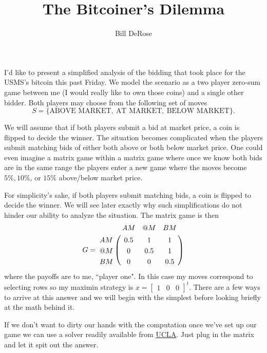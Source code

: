\documentclass[11pt, oneside]{article}
\title{The Bitcoiner's Dilemma}
\author{Bill DeRose}
\begin{document}

\maketitle
I'd like to present a simplified analysis of the bidding that took place for the 
USMS's bitcoin this past Friday. We model the scenario as a two player
zero-sum game between me (I would really like to own those coins) 
and a single other bidder. Both players may choose from the following set of 
moves $$S =\{\mbox{ABOVE MARKET},~\mbox{AT MARKET},~\mbox{BELOW MARKET}\}.$$

We will assume that if both players submit a bid at market price, a coin
is flipped to decide the winner. The situation becomes complicated when the 
players submit matching bids of either both above or both below market price.
One could even imagine a matrix game within a matrix
game where once we know both bids are in the same range the players enter a new
game where the moves become $5\%, 10\%$, or $15\%$ above/below market price.


For simplicity's sake, if both players submit matching bids, a coin
is flipped to decide the winner. We will see later exactly why
such simplifications do not hinder our ability to analyze the situation.
The matrix game is then 
\begin{align*}
G = \bordermatrix{
      &   AM & @M & BM\cr
      AM & 0.5 & 1 & 1\cr
    	@M & 0 & 0.5 & 1\cr
			BM & 0 & 0 & 0.5\cr}
\end{align*}
where the payoffs are to me, ``player one". In this case my moves correspond to 
selecting rows so 
my maximin strategy is $x = \begin{bmatrix}1 & 0 & 0 \end{bmatrix}^t$. 
There are a few ways to arrive at this answer and we will begin with
the simplest before looking briefly at the math behind it.


If we don't want to dirty our hands with the computation once we've set
up our game we can use a solver readily available from
\href{http://www.math.ucla.edu/~tom/gamesolve.html}{\uline{UCLA}}. Just plug in the
matrix and let it spit out the answer.
\end{document}

